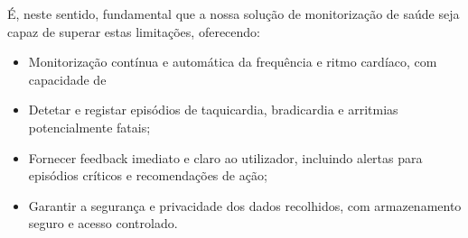\documentclass[11pt,a4paper]{article}
\begin{document}
É, neste sentido, fundamental que a nossa solução de monitorização de saúde seja capaz de superar estas limitações, oferecendo:
\begin{itemize}
      \item Monitorização contínua e automática da frequência e ritmo cardíaco, com capacidade de
      \item Detetar e registar episódios de taquicardia, bradicardia e arritmias potencialmente fatais;
      \item Fornecer feedback imediato e claro ao utilizador, incluindo alertas para episódios      críticos e recomendações de ação;
      \item Garantir a segurança e privacidade dos dados recolhidos, com armazenamento seguro e acesso controlado.
\end{itemize}



\end{document}
